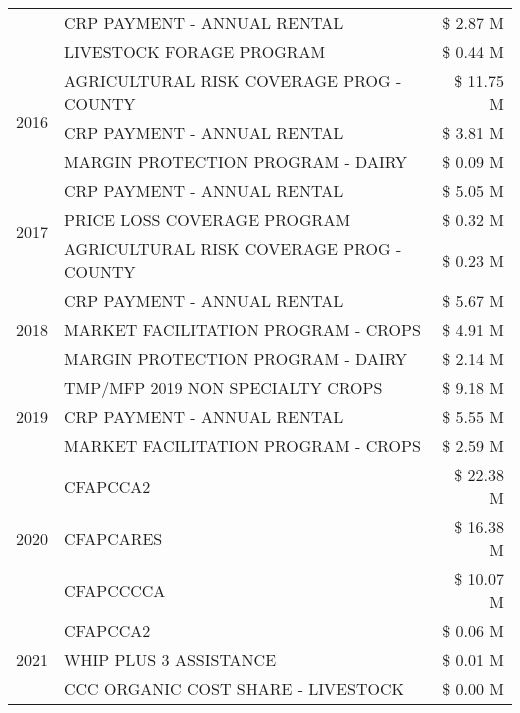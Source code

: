\begin{tabular}{llr}
 & CRP PAYMENT - ANNUAL RENTAL & \$ 2.87 M \\
 & LIVESTOCK FORAGE PROGRAM & \$ 0.44 M \\
\cline{1-3}
\multirow[t]{3}{*}{2016} & AGRICULTURAL RISK COVERAGE PROG - COUNTY & \$ 11.75 M \\
 & CRP PAYMENT - ANNUAL RENTAL & \$ 3.81 M \\
 & MARGIN PROTECTION PROGRAM - DAIRY & \$ 0.09 M \\
\cline{1-3}
\multirow[t]{3}{*}{2017} & CRP PAYMENT - ANNUAL RENTAL & \$ 5.05 M \\
 & PRICE LOSS COVERAGE PROGRAM & \$ 0.32 M \\
 & AGRICULTURAL RISK COVERAGE PROG - COUNTY & \$ 0.23 M \\
\cline{1-3}
\multirow[t]{3}{*}{2018} & CRP PAYMENT - ANNUAL RENTAL & \$ 5.67 M \\
 & MARKET FACILITATION PROGRAM - CROPS & \$ 4.91 M \\
 & MARGIN PROTECTION PROGRAM - DAIRY & \$ 2.14 M \\
\cline{1-3}
\multirow[t]{3}{*}{2019} & TMP/MFP 2019 NON SPECIALTY CROPS & \$ 9.18 M \\
 & CRP PAYMENT - ANNUAL RENTAL & \$ 5.55 M \\
 & MARKET FACILITATION PROGRAM - CROPS & \$ 2.59 M \\
\cline{1-3}
\multirow[t]{3}{*}{2020} & CFAPCCA2 & \$ 22.38 M \\
 & CFAPCARES & \$ 16.38 M \\
 & CFAPCCCCA & \$ 10.07 M \\
\cline{1-3}
\multirow[t]{3}{*}{2021} & CFAPCCA2 & \$ 0.06 M \\
 & WHIP PLUS 3 ASSISTANCE & \$ 0.01 M \\
 & CCC ORGANIC COST SHARE - LIVESTOCK & \$ 0.00 M \\
\cline{1-3}
\bottomrule
\end{tabular}
